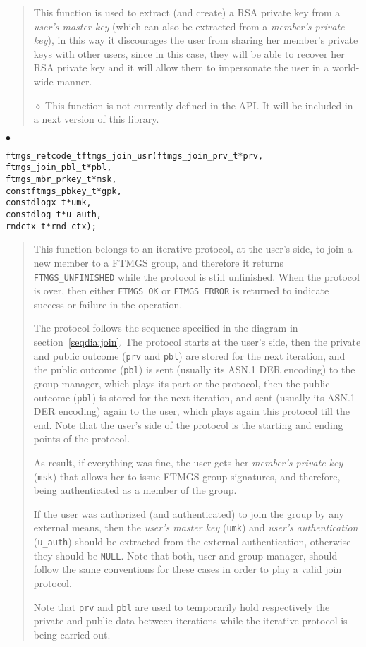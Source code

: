 \documentclass[a4paper]{article}
\newenvironment{api}%
{\noindent$\bullet$\hfill\begin{minipage}[t]{0.97\linewidth}\footnotesize\begin{alltt}}%
{\end{alltt}\end{minipage}}%
\begin{document}
\begin{quote}\footnotesize
This function is used to extract (and create) a RSA private key from a
\emph{user's master key} (which can also be extracted from a
\emph{member's private key}), in this way it discourages the user from
sharing her member's private keys with other users, since in this
case, they will be able to recover her RSA private key and it will
allow them to impersonate the user in a world-wide manner.

$\diamond$ This function is not currently defined in the API. It will
be included in a next version of this library.
\end{quote}
\begin{api}
ftmgs_retcode_t ftmgs_join_usr(ftmgs_join_prv_t* prv,
                               ftmgs_join_pbl_t* pbl,
                               ftmgs_mbr_prkey_t* msk,
                               const ftmgs_pbkey_t* gpk,
                               const dlogx_t* umk,
                               const dlog_t* u_auth,
                               rndctx_t* rnd_ctx);
\end{api}
\begin{quote}\footnotesize
This function belongs to an iterative protocol, at the user's side, to
join a new member to a FTMGS group, and therefore it returns
\verb|FTMGS_UNFINISHED| while the protocol is still unfinished. When
the protocol is over, then either \verb|FTMGS_OK| or
\verb|FTMGS_ERROR| is returned to indicate success or failure in the
operation.

The protocol follows the sequence specified in the diagram in
section~\ref{seqdia:join}. The protocol starts at the user's side,
then the private and public outcome (\verb|prv| and \verb|pbl|) are
stored for the next iteration, and the public outcome (\verb|pbl|) is
sent (usually its ASN.1 DER encoding) to the group manager, which
plays its part or the protocol, then the public outcome (\verb|pbl|)
is stored for the next iteration, and sent (usually its ASN.1 DER
encoding) again to the user, which plays again this protocol till the
end. Note that the user's side of the protocol is the starting and
ending points of the protocol.

As result, if everything was fine, the user gets her \emph{member's
  private key} (\verb|msk|) that allows her to issue FTMGS group
signatures, and therefore, being authenticated as a member of the
group.

If the user was authorized (and authenticated) to join the group by
any external means, then the \emph{user's master key} (\verb|umk|) and
\emph{user's authentication} (\verb|u_auth|) should be extracted from
the external authentication, otherwise they should be
\verb|NULL|. Note that both, user and group manager, should follow the
same conventions for these cases in order to play a valid join protocol.

Note that \verb|prv| and \verb|pbl| are used to temporarily hold
respectively the private and public data between iterations while the
iterative protocol is being carried out.
\end{quote}
\end{document}
